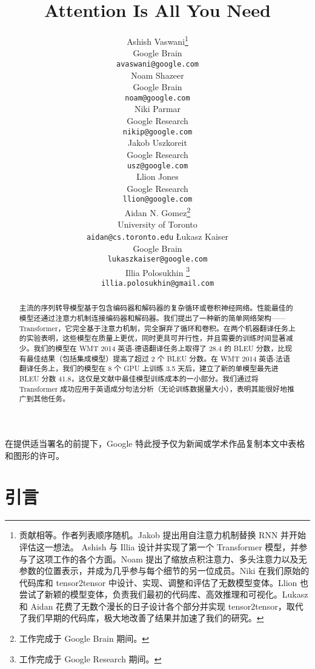\documentclass{article}
\title{Attention Is All You Need}
\author{
  \AND
  Ashish Vaswani\thanks{贡献相等。作者列表顺序随机。Jakob 提出用自注意力机制替换 RNN 并开始评估这一想法。
Ashish 与 Illia 设计并实现了第一个 Transformer 模型，并参与了这项工作的各个方面。Noam 提出了缩放点积注意力、多头注意力以及无参数的位置表示，并成为几乎参与每个细节的另一位成员。Niki 在我们原始的代码库和 tensor2tensor 中设计、实现、调整和评估了无数模型变体。Llion 也尝试了新颖的模型变体，负责我们最初的代码库、高效推理和可视化。Lukasz 和 Aidan 花费了无数个漫长的日子设计各个部分并实现 tensor2tensor，取代了我们早期的代码库，极大地改善了结果并加速了我们的研究。
}\\
  Google Brain\\
  \texttt{avaswani@google.com}\\
  \And
  Noam Shazeer\footnotemark[1]\\
  Google Brain\\
  \texttt{noam@google.com}\\
  \And
  Niki Parmar\footnotemark[1]\\
  Google Research\\
  \texttt{nikip@google.com}\\
  \And
  Jakob Uszkoreit\footnotemark[1]\\
  Google Research\\
  \texttt{usz@google.com}\\
  \And
  Llion Jones\footnotemark[1]\\
  Google Research\\
  \texttt{llion@google.com}\\
  \And
  Aidan N. Gomez\footnotemark[1] \hspace{1.7mm}\thanks{工作完成于 Google Brain 期间。}\\
  University of Toronto\\
  \texttt{aidan@cs.toronto.edu}
  \And
  {\L}ukasz Kaiser\footnotemark[1]\\
  Google Brain\\
  \texttt{lukaszkaiser@google.com}\\
  \And
  Illia Polosukhin\footnotemark[1]\hspace{1.7mm} \thanks{工作完成于 Google Research 期间。}\\
  \texttt{illia.polosukhin@gmail.com}\\
}
\begin{document}
\begin{center}
    \color{red}
    \large 在提供适当署名的前提下，Google 特此授予仅为新闻或学术作品复制本文中表格和图形的许可。
\end{center}

\maketitle

\begin{abstract}
主流的序列转导模型基于包含编码器和解码器的复杂循环或卷积神经网络。性能最佳的模型还通过注意力机制连接编码器和解码器。我们提出了一种新的简单网络架构——Transformer，它完全基于注意力机制，完全摒弃了循环和卷积。在两个机器翻译任务上的实验表明，这些模型在质量上更优，同时更具可并行性，并且需要的训练时间显著减少。我们的模型在 WMT 2014 英语-德语翻译任务上取得了 28.4 的 BLEU 分数，比现有最佳结果（包括集成模型）提高了超过 2 个 BLEU 分数。在 WMT 2014 英语-法语翻译任务上，我们的模型在 8 个 GPU 上训练 3.5 天后，建立了新的单模型最先进 BLEU 分数 41.8，这仅是文献中最佳模型训练成本的一小部分。我们通过将 Transformer 成功应用于英语成分句法分析（无论训练数据量大小），表明其能很好地推广到其他任务。



\end{abstract}

\section{引言}
\end{document}
